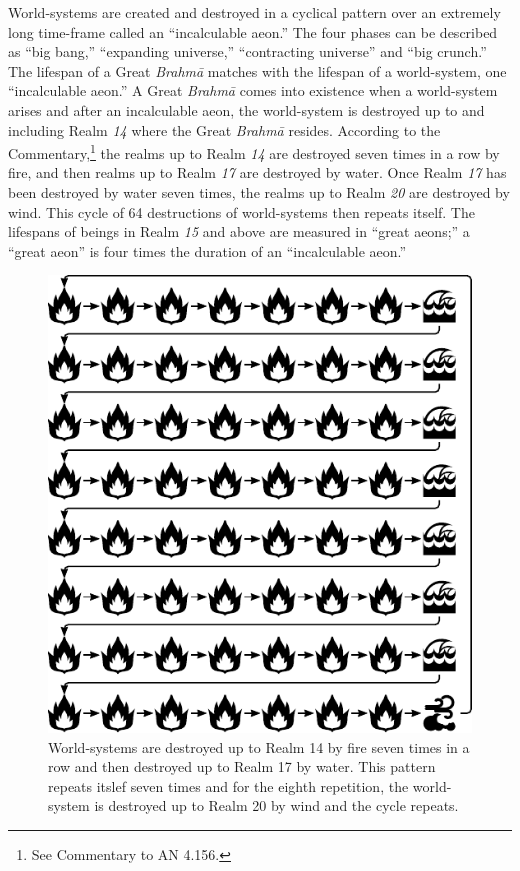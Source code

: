 World-systems are created and destroyed in a cyclical pattern over an extremely long time-frame called an “incalculable aeon.” The four phases can be described as “big bang,” “expanding universe,” “contracting universe” and “big crunch.” The lifespan of a Great \textit{Brahmā} matches with the lifespan of a world-system, one “incalculable aeon.” A Great \textit{Brahmā} comes into existence when a world-system arises and after an incalculable aeon, the world-system is destroyed up to and including Realm \textit{14} where the Great \textit{Brahmā} resides. According to the Commentary,\footnote{See Commentary to AN 4.156.} the realms up to Realm \textit{14} are destroyed seven times in a row by fire, and then realms up to Realm \textit{17} are destroyed by water. Once Realm \textit{17} has been destroyed by water seven times, the realms up to Realm \textit{20} are destroyed by wind. This cycle of 64 destructions of world-systems then repeats itself. The lifespans of beings in Realm \textit{15} and above are measured in “great aeons;” a “great aeon” is four times the duration of an “incalculable aeon.”

\begin{figure}[h]
\centering
\includegraphics[width=0.7\linewidth]{./Diagrams/Worlds}
\caption{World-systems are destroyed up to Realm 14 by fire seven times in a row and then destroyed up to Realm 17 by water. This pattern repeats itslef seven times and for the eighth repetition, the world-system is destroyed up to Realm 20 by wind and the cycle repeats.}
\label{fig:Worlds}
\end{figure}

